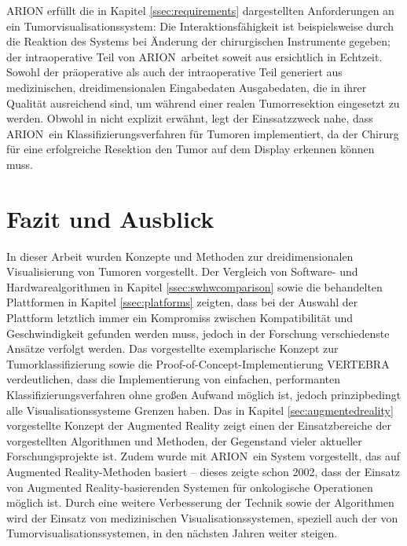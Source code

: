\documentclass[ngerman,pdftex,paper=A4,DIV=calc,titlepage,12pt]{scrartcl}
\newtheorem[L]{boxedDefinition}{Definition}
\begin{document}
ARION erfüllt die in Kapitel \ref{ssec:requirements} dargestellten Anforderungen an ein Tumorvisualisationssystem: Die Interaktionsfähigkeit ist beispielsweise durch die Reaktion des Systems bei Änderung der chirurgischen Instrumente gegeben; der intraoperative Teil von ARION\texttrademark\ arbeitet soweit aus \cite{Suthau2002DE} ersichtlich in Echtzeit. Sowohl der präoperative  als auch der intraoperative Teil generiert aus medizinischen, dreidimensionalen Eingabedaten Ausgabedaten, die in ihrer Qualität ausreichend sind, um während einer realen Tumorresektion eingesetzt zu werden. Obwohl in \cite{Suthau2002DE} nicht explizit erwähnt, legt der Einssatzzweck nahe, dass ARION\texttrademark\ ein Klassifizierungsverfahren für Tumoren implementiert, da der Chirurg für eine erfolgreiche Resektion den Tumor auf dem Display erkennen können muss.

\section{Fazit und Ausblick}\label{sec:facit}
In dieser Arbeit wurden Konzepte und Methoden zur dreidimensionalen Visualisierung von Tumoren vorgestellt.
Der Vergleich von Software- und Hardwarealgorithmen in Kapitel \ref{ssec:swhwcomparison} sowie die behandelten Plattformen in Kapitel \ref{ssec:platforms} zeigten, dass bei der Auswahl der Plattform letztlich immer ein Kompromiss zwischen Kompatibilität und Geschwindigkeit gefunden werden muss, jedoch in der Forschung verschiedenste Ansätze verfolgt werden. Das vorgestellte exemplarische Konzept zur Tumorklassifizierung sowie die Proof-of-Concept-Implementierung VERTEBRA verdeutlichen, dass die Implementierung von einfachen, performanten Klassifizierungsverfahren ohne großen Aufwand möglich ist, jedoch prinzipbedingt alle Visualisationssysteme Grenzen haben.
Das in Kapitel \ref{sec:augmentedreality} vorgestellte Konzept der Augmented Reality zeigt einen der Einsatzbereiche der vorgestellten Algorithmen und Methoden, der Gegenstand vieler aktueller Forschungsprojekte ist. Zudem wurde mit ARION\texttrademark\ ein System vorgestellt, das auf Augmented Reality-Methoden basiert -- dieses zeigte schon 2002, dass der Einsatz von Augmented Reality-basierenden Systemen für onkologische Operationen möglich ist. Durch eine weitere Verbesserung der Technik sowie der Algorithmen wird der Einsatz von medizinischen Visualisationssystemen, speziell auch der von Tumorvisualisationssystemen, in den nächsten Jahren weiter steigen.

\newpage
%
%
\appendix\label{appendixstart}
\end{document}
